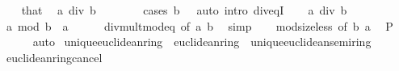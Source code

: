 \begin{isabellebody}
\ \ \isamarkupfalse%
\ that\ \isamarkupfalse%
\ {\isachardoublequoteopen}a\ div\ b\ {\isacharequal}{\kern0pt}\ {}{\isachardoublequoteclose}\isanewline
\ \ \ \ \isamarkupfalse%
\ {\isacharparenleft}{\kern0pt}cases\ {\isachardoublequoteopen}b\ {\isacharequal}{\kern0pt}\ {}{\isachardoublequoteclose}{\isacharparenright}{\kern0pt}\ {\isacharparenleft}{\kern0pt}auto\ intro{\isacharcolon}{\kern0pt}\ div{\isacharunderscore}{\kern0pt}eqI{\isacharparenright}{\kern0pt}\isanewline
{}\isamarkupfalse%
\isanewline
\ \ \isamarkupfalse%
\ {\isachardoublequoteopen}a\ div\ b\ {\isacharequal}{\kern0pt}\ {}{\isachardoublequoteclose}\isanewline
\ \ \isamarkupfalse%
\ \isamarkupfalse%
\ {\isachardoublequoteopen}a\ mod\ b\ {\isacharequal}{\kern0pt}\ a{\isachardoublequoteclose}\isanewline
\ \ \ \ \isamarkupfalse%
\ div{\isacharunderscore}{\kern0pt}mult{\isacharunderscore}{\kern0pt}mod{\isacharunderscore}{\kern0pt}eq\ {\isacharbrackleft}{\kern0pt}of\ a\ b{\isacharbrackright}{\kern0pt}\ \isamarkupfalse%
\ simp\isanewline
\ \ \isamarkupfalse%
\ mod{\isacharunderscore}{\kern0pt}size{\isacharunderscore}{\kern0pt}less\ {\isacharbrackleft}{\kern0pt}of\ b\ a{\isacharbrackright}{\kern0pt}\ \isamarkupfalse%
\ {\isacharquery}{\kern0pt}P\isanewline
\ \ \ \ \isamarkupfalse%
\ auto\isanewline
{}\isamarkupfalse%
%
\endisatagproof
{\isafoldproof}%
%
\isadelimproof
\isanewline
%
\endisadelimproof
\isanewline
{}\isamarkupfalse%
\isanewline
\isanewline
{}\isamarkupfalse%
\ unique{\isacharunderscore}{\kern0pt}euclidean{\isacharunderscore}{\kern0pt}ring\ {\isacharequal}{\kern0pt}\ euclidean{\isacharunderscore}{\kern0pt}ring\ {\isacharplus}{\kern0pt}\ unique{\isacharunderscore}{\kern0pt}euclidean{\isacharunderscore}{\kern0pt}semiring\isanewline
{}\isanewline
\ \ \isanewline
{}\isamarkupfalse%
\ euclidean{\isacharunderscore}{\kern0pt}ring{\isacharunderscore}{\kern0pt}cancel%
\isadelimproof
\ %
\endisadelimproof
%
\isatagproof
\isacommand{{\isachardot}{\kern0pt}{\isachardot}{\kern0pt}}\isamarkupfalse%
%
\endisatagproof
{\isafoldproof}%
%
\isadelimproof
%
\endisadelimproof
\isanewline
\isanewline
{}\isamarkupfalse%
%
\isadelimdocument
%
\endisadelimdocument
%
\isatagdocument
%
\isamarkuptrue%
%
\endisatagdocument
{\isafolddocument}%

\end{isabellebody}
